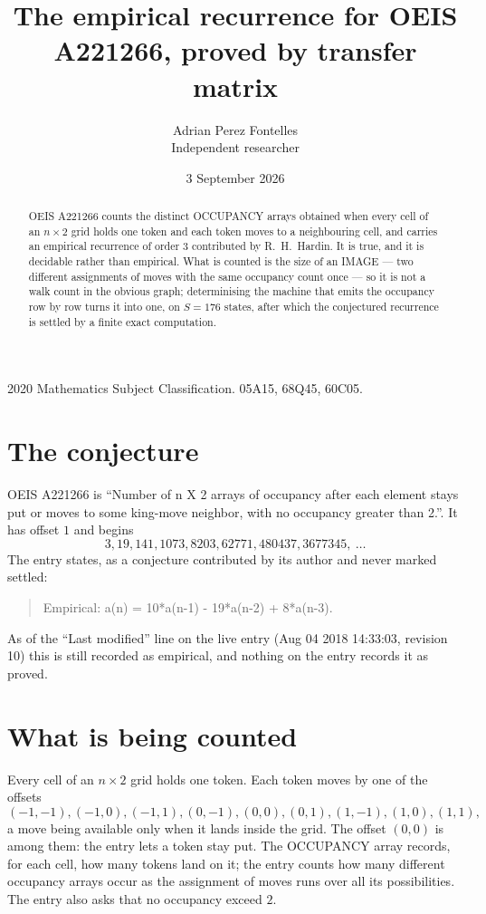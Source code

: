 \documentclass[11pt,a4paper]{article}
\title{The empirical recurrence for OEIS A221266, proved by transfer matrix}
\author{Adrian Perez Fontelles\\ \small Independent researcher}
\date{3 September 2026}
\theoremstyle{plain}
\theoremstyle{definition}
\begin{document}
\maketitle

\begin{abstract}
OEIS A221266 counts the distinct OCCUPANCY arrays obtained when every cell of an $n\times2$ grid
holds one token and each token moves to a neighbouring cell, and carries an empirical
recurrence of order $3$ contributed by R.~H.~Hardin. It is true, and it is decidable
rather than empirical. What is counted is the size of an IMAGE --- two different assignments of
moves with the same occupancy count once --- so it is not a walk count in the obvious graph;
determinising the machine that emits the occupancy row by row turns it into one, on $S=176$
states, after which the conjectured recurrence is settled by a finite exact computation.
\end{abstract}

\noindent\small 2020 Mathematics Subject Classification. 05A15, 68Q45, 60C05.\normalsize

\section{The conjecture}

OEIS A221266 is ``Number of n X 2 arrays of occupancy after each element stays put or moves to some king-move neighbor, with no occupancy greater than 2.''. It has offset $1$ and begins
\[
3, 19, 141, 1073, 8203, 62771, 480437, 3677345,\ \dots
\]
The entry states, as a conjecture contributed by its author and never marked settled:
\begin{quote}
Empirical: a(n) = 10*a(n-1) - 19*a(n-2) + 8*a(n-3).
\end{quote}
As of the ``Last modified'' line on the live entry (Aug 04 2018 14:33:03, revision 10) this is still
recorded as empirical, and nothing on the entry records it as proved.

\section{What is being counted}

Every cell of an $n\times2$ grid holds one token. Each token moves by one of the offsets
\[
(-1,-1), (-1,0), (-1,1), (0,-1), (0,0), (0,1), (1,-1), (1,0), (1,1),
\]
a move being available only when it lands inside the grid. The offset $(0,0)$ is among them: the entry lets a token stay put. The OCCUPANCY array
records, for each cell, how many tokens land on it; the entry counts how many different
occupancy arrays occur as the assignment of moves runs over all its possibilities. The entry also asks that no occupancy exceed $2$.
\end{document}
